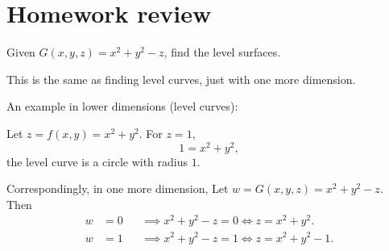 \documentclass[11pt]{article}
\begin{document}
\section*{Homework review}

Given \(G(x, y, z) = x^2 + y^2 - z\), find the level surfaces.

This is the same as finding level curves, just with one more dimension. 

\begin{framed}
    An example in lower dimensions (level curves):

    Let \(z = f(x, y) = x^2 + y^2\). For \(z = 1\),
    \[
        1 = x^2 + y^2,
    \]
    the level curve is a circle with radius \(1\).
\end{framed}

Correspondingly, in one more dimension, Let \(w = G(x, y, z) = x^2 + y^2 - z\). Then
\begin{align*}
    w &= 0 &&\implies x^2 + y^2 - z = 0 \iff z = x^2 + y^2. \\
    w &= 1 &&\implies x^2 + y^2 - z = 1 \iff z = x^2 + y^2 - 1.
\end{align*}
\end{document}
